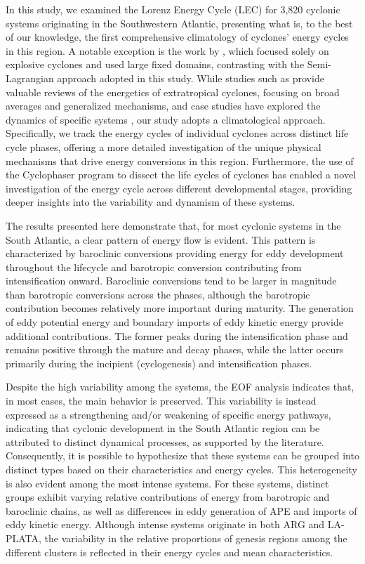 \documentclass[pdflatex,sn-chicago]{sn-jnl}%
\theoremstyle{plain}
\theoremstyle{definition}
\theoremstyle{remark}
\theoremstyle{definition}
\begin{document}
In this study, we examined the Lorenz Energy Cycle (LEC) for 3,820 cyclonic systems originating in the Southwestern Atlantic, presenting what is, to the best of our knowledge, the first comprehensive climatology of cyclones' energy cycles in this region. A notable exception is the work by \citet{black2013universal}, which focused solely on explosive cyclones and used large fixed domains, contrasting with the Semi-Lagrangian approach adopted in this study. While studies such as \citet{smith1980energetics} provide valuable reviews of the energetics of extratropical cyclones, focusing on broad averages and generalized mechanisms, and case studies have explored the dynamics of specific systems \citep[e.g.]{pezza2014large,dias2011energy,cavicchia2018energetics}, our study adopts a climatological approach. Specifically, we track the energy cycles of individual cyclones across distinct life cycle phases, offering a more detailed investigation of the unique physical mechanisms that drive energy conversions in this region. Furthermore, the use of the Cyclophaser program to dissect the life cycles of cyclones has enabled a novel investigation of the energy cycle across different developmental stages, providing deeper insights into the variability and dynamism of these systems.

The results presented here demonstrate that, for most cyclonic systems in the South Atlantic, a clear pattern of energy flow is evident. This pattern is characterized by baroclinic conversions providing energy for eddy development throughout the lifecycle and barotropic conversion contributing from intensification onward. Baroclinic conversions tend to be larger in magnitude than barotropic conversions across the phases, although the barotropic contribution becomes relatively more important during maturity. The generation of eddy potential energy and boundary imports of eddy kinetic energy provide additional contributions. The former peaks during the intensification phase and remains positive through the mature and decay phases, while the latter occurs primarily during the incipient (cyclogenesis) and intensification phases.

Despite the high variability among the systems, the EOF analysis indicates that, in most cases, the main behavior is preserved. This variability is instead expressed as a strengthening and/or weakening of specific energy pathways, indicating that cyclonic development in the South Atlantic region can be attributed to distinct dynamical processes, as supported by the literature. Consequently, it is possible to hypothesize that these systems can be grouped into distinct types based on their characteristics and energy cycles. This heterogeneity is also evident among the most intense systems. For these systems, distinct groups exhibit varying relative contributions of energy from barotropic and baroclinic chains, as well as differences in eddy generation of APE and imports of eddy kinetic energy. Although intense systems originate in both ARG and LA-PLATA, the variability in the relative proportions of genesis regions among the different clusters is reflected in their energy cycles and mean characteristics.
\end{document}
